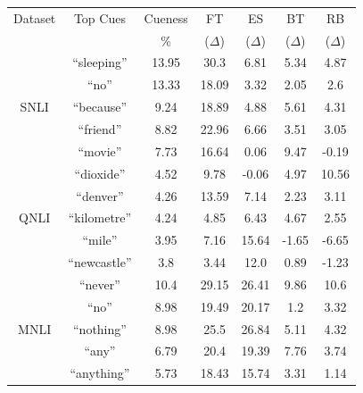 \begin{table}[th]
\centering
\scriptsize
\begin{tabular}{c|c|c|c|c|c|c} \hline
Dataset & Top Cues & Cueness & FT  & ES & BT & RB\\ 
	&	& \%	& ($\Delta$)& ($\Delta$)& ($\Delta$)& ($\Delta$) \\ \hline
\multirow{5}{*}{SNLI} 
& ``sleeping'' & 13.95 & 30.3 &6.81 & 5.34& 4.87 \\                                                                    
& ``no'' & 13.33 & 18.09 &3.32 & 2.05& 2.6 \\
& ``because'' & 9.24 & 18.89 &4.88 & 5.61& 4.31 \\
& ``friend'' & 8.82 & 22.96 &6.66 & 3.51& 3.05 \\
& ``movie'' & 7.73 & 16.64 &0.06 & 9.47& -0.19 \\
	   \hline 
\multirow{5}{*}{QNLI} 
& ``dioxide'' & 4.52 & 9.78 &-0.06 & 4.97& 10.56 \\                                                                    
& ``denver'' & 4.26 & 13.59 &7.14 & 2.23& 3.11 \\
& ``kilometre'' & 4.24 & 4.85 &6.43 & 4.67& 2.55 \\
& ``mile'' & 3.95 & 7.16 &15.64 & -1.65& -6.65 \\
& ``newcastle'' & 3.8 & 3.44 &12.0 & 0.89& -1.23 \\
	   \hline 
\multirow{5}{*}{MNLI} 
& ``never'' & 10.4 & 29.15 &26.41 & 9.86& 10.6 \\                                                                      
& ``no'' & 8.98 & 19.49 &20.17 & 1.2& 3.32 \\
& ``nothing'' & 8.98 & 25.5 &26.84 & 5.11& 4.32 \\
& ``any'' & 6.79 & 20.4 &19.39 & 7.76& 3.74 \\
& ``anything'' & 5.73 & 18.43 &15.74 & 3.31& 1.14 \\
	   

\end{tabular}
\end{table}
